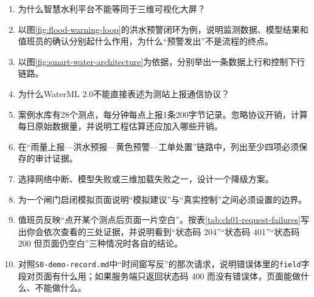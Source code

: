 \begin{enumerate}
\item 为什么智慧水利平台不能等同于三维可视化大屏？
\item 以图\ref{fig:flood-warning-loop}的洪水预警闭环为例，说明监测数据、模型结果和值班员的确认分别起什么作用，为什么“预警发出”不是流程的终点。
\item 以图\ref{fig:smart-water-architecture}为依据，分别举出一条数据上行和控制下行链路。
\item 为什么WaterML 2.0不能直接表述为测站上报通信协议？
\item 案例水库有28个测点，每分钟每点上报1条200字节记录。忽略协议开销，计算每日原始数据量，并说明工程估算还应加入哪些开销。
\item 在“雨量上报—洪水预报—黄色预警—工单处置”链路中，列出至少四项必须保存的审计证据。
\item 选择网络中断、模型失败或三维加载失败之一，设计一个降级方案。
\item 为一个闸门启闭模拟页面说明“模拟建议”与“真实控制”之间必须设置的边界。
\item 值班员反映“点开某个测点后页面一片空白”。按表\ref{tab:ch01-request-failures}写出你会依次查看的三处证据，并说明看到“状态码 204”“状态码 401”“状态码 200 但页面仍空白”三种情况时各自的结论。
\item 对照\texttt{S0-demo-record.md}中“时间窗写反”的那次请求，说明错误体里的\texttt{field}字段对页面有什么用；如果服务端只返回状态码 400 而没有错误体，页面能做什么、不能做什么。
\end{enumerate}
